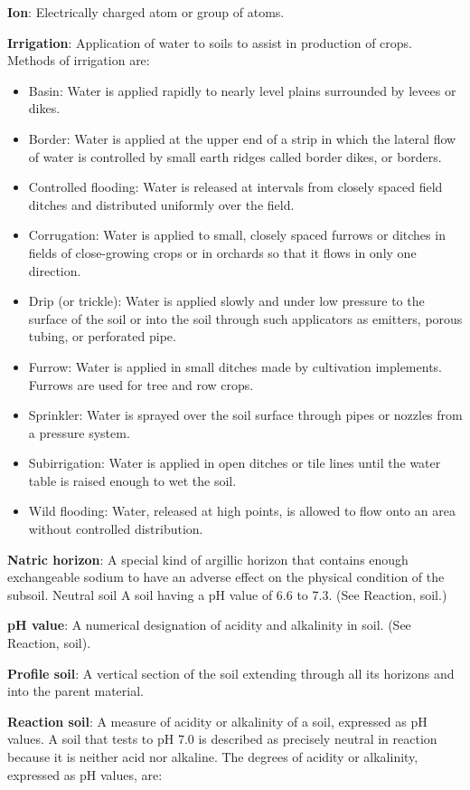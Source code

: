 \documentclass[
  10pt,
  b5paper,
]{book}
\providecommand{\tightlist}{%
  \setlength{\itemsep}{0pt}\setlength{\parskip}{0pt}}
\begin{document}
\textbf{Ion}: Electrically charged atom or group of atoms.

\textbf{Irrigation}: Application of water to soils to assist in production of crops. Methods of irrigation are:

\begin{itemize}
\tightlist
\item
  Basin: Water is applied rapidly to nearly level plains surrounded by levees or dikes.
\item
  Border: Water is applied at the upper end of a strip in which the lateral flow of water is controlled by small earth ridges called border dikes, or borders.
\item
  Controlled flooding: Water is released at intervals from closely spaced field ditches and distributed uniformly over the field.
\item
  Corrugation: Water is applied to small, closely spaced furrows or ditches in fields of close-growing crops or in orchards so that it flows in only one direction.
\item
  Drip (or trickle): Water is applied slowly and under low pressure to the surface of the soil or into the soil through such applicators as emitters, porous tubing, or perforated pipe.
\item
  Furrow: Water is applied in small ditches made by cultivation implements. Furrows are used for tree and row crops.
\item
  Sprinkler: Water is sprayed over the soil surface through pipes or nozzles from a pressure system.
\item
  Subirrigation: Water is applied in open ditches or tile lines until the water table is raised enough to wet the soil.
\item
  Wild flooding: Water, released at high points, is allowed to flow onto an area without controlled distribution.
\end{itemize}

\textbf{Natric horizon}: A special kind of argillic horizon that contains enough exchangeable sodium to have an adverse effect on the physical condition of the subsoil. Neutral soil A soil having a pH value of 6.6 to 7.3. (See Reaction, soil.)

\textbf{pH value}: A numerical designation of acidity and alkalinity in soil. (See Reaction, soil).

\textbf{Profile soil}: A vertical section of the soil extending through all its horizons and into the parent material.

\textbf{Reaction soil}: A measure of acidity or alkalinity of a soil, expressed as pH values. A soil that tests to pH 7.0 is described as precisely neutral in reaction because it is neither acid nor alkaline. The degrees of acidity or alkalinity, expressed as pH values, are:
\end{document}
